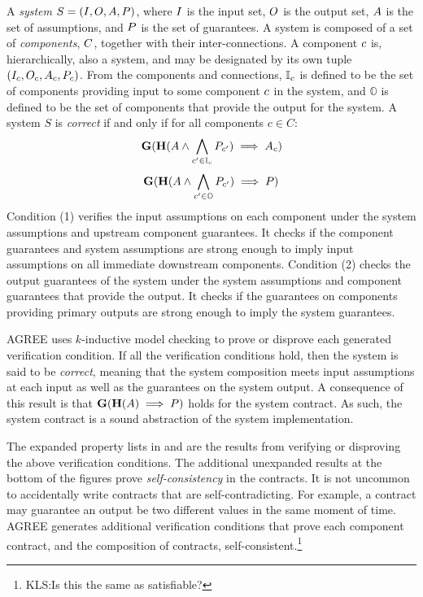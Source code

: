 A \emph{system} $S = (I, O, A,
P)$, where $I$ is the input set, $O$ is the
output set, $A$ is the set of assumptions, and $P$ is
the set of guarantees.  A system is composed of a set of
\emph{components}, $C$, together with their
inter-connections.  A component $c$ is, hierarchically, also
a system, and may be designated by its own tuple
$(I_{c}, O_{c}, A_{c},
P_{c})$.  From the components and connections,
$\mathbb{I}_{c}$ is defined to be the set of components
providing input to some component $c$ in the system, and
$\mathbb{O}$ is defined to be the set of components that provide the
output for the system.  A system $S$ is \emph{correct} if and only if for all
components $c \in C$:
\begin{equation}
            \mathbf{G}(\mathbf{H}(A \wedge
            \bigwedge_{c^\prime \in \mathbb{I}_{c}} P_{c^\prime})
            \implies A_{c})
\end{equation}
\begin{equation}
            \mathbf{G}(\mathbf{H}(A \wedge
            \bigwedge_{c^\prime \in \mathbb{O}} P_{c^\prime})
            \implies P)
\end{equation}
Condition (1) verifies the input assumptions on each component under
the system assumptions and upstream component guarantees.  It checks
if the component guarantees and system assumptions are strong enough
to imply input assumptions on all immediate downstream components.
Condition (2) checks the output guarantees of the system under the
system assumptions and component guarantees that provide the output.
It checks if the guarantees on components providing primary outputs
are strong enough to imply the system guarantees.

AGREE uses $k$-inductive model checking to prove or disprove each
generated verification condition.  If all the verification conditions
hold, then the system is said to be \emph{correct}, meaning that the
system composition meets input assumptions at each input as well as
the guarantees on the system output. A consequence of this result is
that $\mathbf{G}(\mathbf{H}(A) \implies P)$ holds
for the system contract. As such, the system contract is a sound
abstraction of the system implementation.

The expanded property lists in  and
 are the results from verifying or
disproving the above verification conditions.  The additional
unexpanded results at the bottom of the figures prove
\emph{self-consistency} in the contracts.  It is not uncommon to
accidentally write contracts that are self-contradicting.  For
example, a contract may guarantee an output be two different values in
the same moment of time.  AGREE generates additional verification
conditions that prove each component contract, and the composition of
contracts, self-consistent.\footnote{KLS:Is this the same as
satisfiable?}

